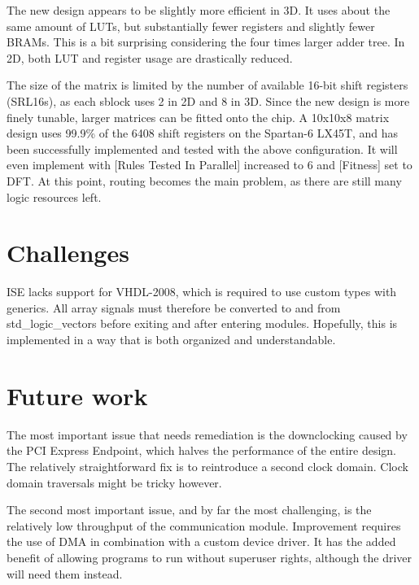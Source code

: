 The new design appears to be slightly more efficient in 3D.
It uses about the same amount of LUTs, but substantially fewer registers and slightly fewer BRAMs.
This is a bit surprising considering the four times larger adder tree.
In 2D, both LUT and register usage are drastically reduced.

The size of the matrix is limited by the number of available 16-bit shift registers (SRL16s), as each sblock uses 2 in 2D and 8 in 3D.
Since the new design is more finely tunable, larger matrices can be fitted onto the chip.
A 10x10x8 matrix design uses 99.9\% of the 6408 shift registers on the Spartan-6 LX45T, and has been successfully implemented and tested with the above configuration.
It will even implement with [Rules Tested In Parallel] increased to 6 and [Fitness] set to DFT.
At this point, routing becomes the main problem, as there are still many logic resources left.


\section{Challenges}
\label{sec:challenges}

\TODO

ISE lacks support for VHDL-2008, which is required to use custom types with generics.
All array signals must therefore be converted to and from std\_logic\_vectors before exiting and after entering modules.
Hopefully, this is implemented in a way that is both organized and understandable.

\TODO


\section{Future work}

The most important issue that needs remediation is the downclocking caused by the PCI Express Endpoint, which halves the performance of the entire design.
The relatively straightforward fix is to reintroduce a second clock domain.
Clock domain traversals might be tricky however.

The second most important issue, and by far the most challenging, is the relatively low throughput of the communication module.
Improvement requires the use of DMA in combination with a custom device driver.
It has the added benefit of allowing programs to run without superuser rights, although the driver will need them instead.

